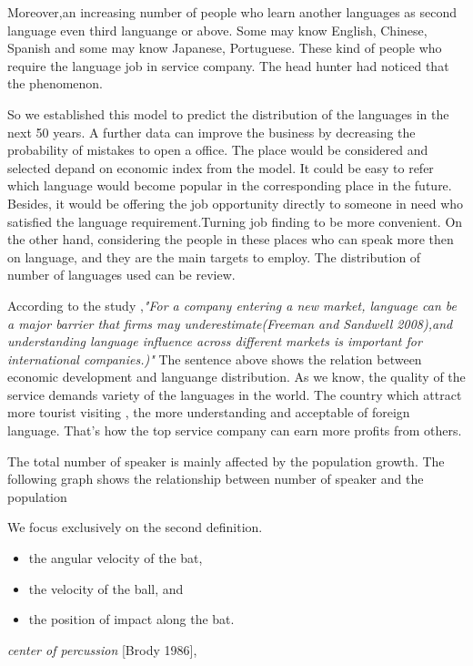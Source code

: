 \documentclass{mcmthesis}
\begin{document}
Moreover,an increasing number of people who learn another languages as second language even third languange or above. 
Some may know English, Chinese, Spanish and some may know Japanese, Portuguese. These kind of people who require the language job in service company.
The head hunter had noticed that the phenomenon. 

So we established this model to predict the distribution of the languages in the next 50 years. A further data can improve the business by decreasing
the probability of mistakes to open a office. The place would be considered and selected depand on economic index from the model.
It could be easy to refer which language would become popular in the corresponding place in the future. Besides,
it would be offering the job opportunity directly to someone in need who satisfied the language requirement.Turning job finding to be more convenient.
On the other hand, considering the people in these places who can speak more then on language, and they are the 
main targets to employ. The distribution of number of languages used can be review.
 
 
According to the study \cite{hel},\emph{"For a company entering a new market, language can be a major barrier that firms
may underestimate(Freeman and Sandwell 2008),and understanding language influence across different markets is important for international companies.)" }
The sentence above shows the relation between economic development and languange distribution. As we know, the quality of the service demands variety of the languages in the world.
The country which attract more tourist visiting , the more understanding and acceptable of foreign language. 
That's how the top service company can earn more profits from others.



The total number of speaker is mainly affected by the population growth. The following graph shows the relationship between number of speaker and the population


We focus exclusively on the second definition.


\begin{itemize}
\item the angular velocity of the bat,
\item the velocity of the ball, and
\item the position of impact along the bat.
\end{itemize}

\emph{center of percussion} [Brody 1986],
\end{document}
